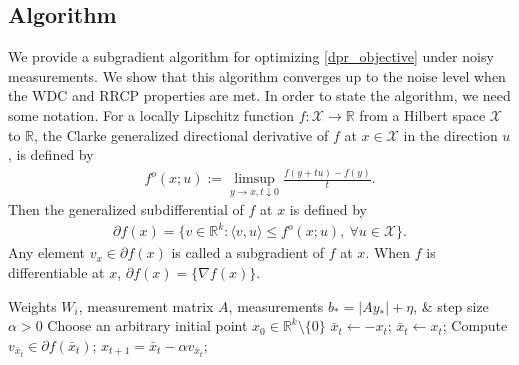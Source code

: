 \documentclass[11pt]{article}
\renewcommand{\epsilon}{\varepsilon}
\newcommand{\R}{\mathbb{R}}
\newcommand{\G}{G}
\renewcommand{\top}{{\mathrm{T}}}
\theoremstyle{remark}
\begin{document}
\subsection{Algorithm}
We provide a subgradient algorithm for optimizing \eqref{dpr_objective} under noisy measurements.  We show that this algorithm converges up to the noise level when the WDC and RRCP  properties are met.  
In order to state the algorithm, we need some notation.  For a locally Lipschitz function $f : \mathcal{X} \rightarrow \R$ from a Hilbert space $\mathcal{X}$ to $\R$, the Clarke generalized directional derivative of $f$ at $x \in \mathcal{X}$ in the direction $u$, is defined by \begin{align*}
    f^o(x;u) := \limsup_{y \rightarrow x, t \downarrow 0} \frac{f(y+tu) - f(y)}{t}.
\end{align*} Then the generalized subdifferential of $f$ at $x$ is defined by \begin{align*}
    \partial f(x) = \{v \in \R^k : \langle v, u \rangle \leqslant f^o(x;u),\ \forall u \in \mathcal{X}\}.
\end{align*} Any element $v_x \in \partial f(x)$ is called a subgradient of $f$ at $x$. When $f$ is differentiable at $x$, $\partial f(x) = \{\nabla f(x)\}$.


\begin{algorithm}
\caption{Deep Phase Retrieval (DPR) Subgradient method}
\label{alg}
\begin{algorithmic}[1]
\REQUIRE Weights $W_i$, measurement matrix $A$, measurements $b_* = |Ay_*| + \eta$, \& step size $\alpha > 0$
\STATE Choose an arbitrary initial point $x_0 \in \mathbb{R}^k\setminus \{0\}$
  \label{alg:st3}
 \label{alg:cond1}
\STATE $\bar{x}_{t} \gets - x_{t}$; \label{alg:cond2}
\ELSE
\STATE $\bar{x}_t \gets x_t$; \label{alg:cond3}
\ENDIF \label{alg:endif}
\STATE Compute $v_{\bar{x}_{t}} \in \partial f(\bar{x}_t)$; %
\STATE $x_{t+1} = \bar{x}_{t} - \alpha  v_{\bar{x}_{t}}$;
\ENDFOR
\end{algorithmic}
\end{algorithm}
\end{document}
